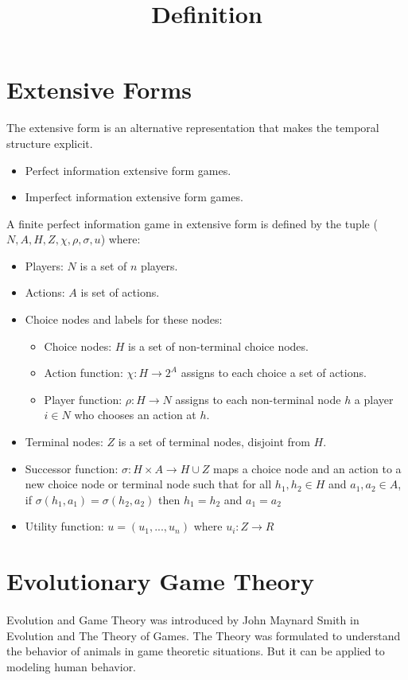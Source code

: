 \documentclass[10pt,a4paper]{report}
\begin{document}
\section{Extensive Forms}{The extensive form is an alternative representation that makes the temporal structure explicit.}
\begin{itemize}
\item{Perfect information extensive form games.}
\item{Imperfect information extensive form games.}
\end{itemize}
\title {\textbf{Definition}} A finite perfect information game in extensive form is defined by the tuple ($N, A, H, Z,\chi ,\rho, \sigma, u $)
where:
\begin{itemize}
\item{Players: $N$ is a set of $n$ players.}
\item{Actions: $A$ is set of actions.}
\item{Choice nodes and labels for these nodes: }
\begin{itemize}
\item{Choice nodes: $H$ is a set of non-terminal choice nodes.}
\item{Action function: $\chi : H \to 2^A $ assigns to each choice a set of actions.}
\item{Player function: $\rho : H \to N$ assigns to each non-terminal node $h$ a player $i \in N$ who chooses an action at $h$.}
\end{itemize}
\item{Terminal nodes: $Z$ is a set of terminal nodes, disjoint from $H$.}
\item{Successor function: $\sigma : H \times A \to H \cup Z$ maps a choice node and an action to a new choice node or terminal node such that for all $h_1, h_2 \in H$ and $a_1, a_2 \in A$, if $\sigma(h_1, a_1) = \sigma(h_2, a_2)$ then $h_1  = h_2$  and $a_1 = a_2$} 
\item{Utility function: $u = (u_1,...,u_n)$ where $u_i : Z \to R$
}
\end{itemize} 
\section{Evolutionary Game Theory}
\paragraph{}Evolution and Game Theory was introduced by John Maynard Smith in Evolution and The Theory of Games. The Theory was formulated to understand the behavior of animals in game theoretic situations. But it can be applied to modeling human behavior.
\end{document}
